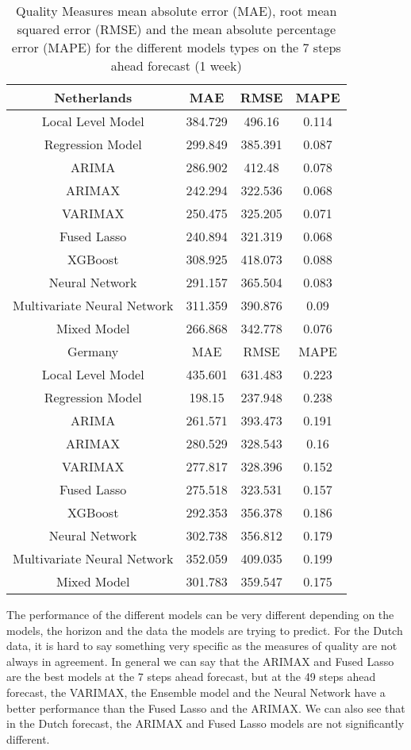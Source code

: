 \begin{table}[]
    \centering
    \begin{tabular}{|c|c c c|}\hline
        Netherlands & MAE & RMSE & MAPE\\\hline
        Local Level Model & 384.729  & 496.16 & 0.114\\
        Regression Model & 299.849 & 385.391 & 0.087\\
        ARIMA & 286.902 & 412.48 & 0.078\\
        ARIMAX & 242.294 & 322.536 & 0.068\\
        VARIMAX & 250.475 & 325.205 & 0.071\\
        Fused Lasso & 240.894 & 321.319 & 0.068\\
        XGBoost & 308.925 & 418.073 & 0.088\\
        Neural Network & 291.157 & 365.504 & 0.083\\
        Multivariate Neural Network & 311.359 & 390.876 & 0.09\\
        Mixed Model & 266.868 & 342.778 & 0.076\\\hline
        Germany & MAE & RMSE & MAPE\\\hline
        Local Level Model & 435.601 & 631.483 & 0.223\\
        Regression Model & 198.15 & 237.948 & 0.238\\
        ARIMA & 261.571 & 393.473 & 0.191\\
        ARIMAX & 280.529 & 328.543 & 0.16\\
        VARIMAX & 277.817 & 328.396 & 0.152\\
        Fused Lasso & 275.518 & 323.531 & 0.157\\
        XGBoost & 292.353 & 356.378 & 0.186\\
        Neural Network & 302.738 & 356.812 & 0.179\\
        Multivariate Neural Network & 352.059 & 409.035 & 0.199\\
        Mixed Model & 301.783 & 359.547 & 0.175\\\hline  
    \end{tabular}
    \caption{Quality Measures mean absolute error (MAE), root mean squared error (RMSE) and the mean absolute percentage error (MAPE) for the different models types on the 7 steps ahead forecast (1 week)}
    \label{tab:1 week ahead}
\end{table}

The performance of the different models can be very different depending on the models, the horizon and the data the models are trying to predict. For the Dutch data, it is hard to say something very specific as the measures of quality are not always in agreement. In general we can say that the ARIMAX and Fused Lasso are the best models at the 7 steps ahead forecast, but at the 49 steps ahead forecast, the VARIMAX, the Ensemble model and the Neural Network have a better performance than the Fused Lasso and the ARIMAX. We can also see that in the Dutch forecast, the ARIMAX and Fused Lasso models are not significantly different.\\

